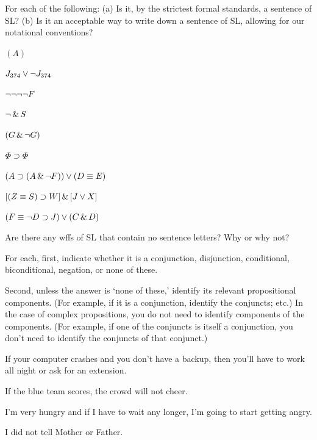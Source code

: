 \solutions
\problempart
\label{pr.wiffSL}
For each of the following: (a) Is it, by the strictest formal standards, a sentence of SL? (b) Is it an acceptable way to write down a sentence of SL, allowing for our notational conventions?
\begin{earg}
\item $(A)$
\item $J_{374} \vee \neg J_{374}$
\item $\neg \neg \neg \neg F$
\item $\neg \,\&\, S$
\item $(G \,\&\, \neg G)$
\item $\varPhi{} \supset \varPhi{}$
\item $(A \supset (A \,\&\, \neg F)) \vee (D \equiv E)$
\item $[(Z \equiv S) \supset W] \,\&\, [J \vee X]$
\item $(F \equiv \neg D \supset J) \vee (C \,\&\, D)$
\end{earg}



\problempart
\begin{earg}
\item Are there any wffs of SL that contain no sentence letters? Why or why not?
\end{earg}

\problempart
\label{HW2.B}
For each, first, indicate whether it is a conjunction, disjunction, conditional, biconditional, negation, or none of these.

Second, unless the answer is ‘none of these,’ identify its relevant propositional components. (For example, if it is a conjunction, identify the conjuncts; etc.) In the case of complex propositions, you do not need to identify components of the components. (For example, if one of the conjuncts is itself a conjunction, you don’t need to identify the conjuncts of that conjunct.)

	\begin{earg}
		\item If your computer crashes and you don’t have a backup, then you’ll have to work all night or ask for an extension.
		\item If the blue team scores, the crowd will not cheer.
		\item I’m very hungry and if I have to wait any longer, I’m going to start getting angry.
		\item I did not tell Mother or Father.
	\end{earg}
	
